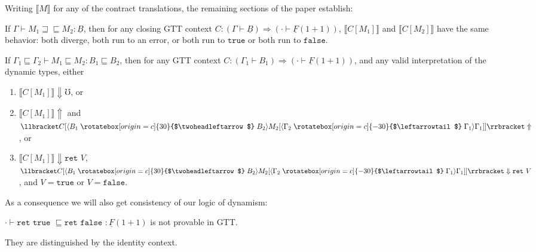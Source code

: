 \documentclass[acmsmall,screen,12pt]{acmart}
\newif\iflong
\renewcommand{\u}{\underline}
\newcommand{\sem}[1]{\llbracket#1\rrbracket}
\newcommand{\ltdyn}{\sqsubseteq}
\newcommand{\gtdyn}{\sqsupseteq}
\newcommand{\equidyn}{\mathrel{\gtdyn\ltdyn}}
\newcommand{\tru}{\texttt{true}}
\newcommand{\fls}{\texttt{false}}
\newcommand{\uarrow}{\mathrel{\rotatebox[origin=c]{-30}{$\leftarrowtail$}}}
\newcommand{\darrow}{\mathrel{\rotatebox[origin=c]{30}{$\twoheadleftarrow$}}}
\newcommand{\upcast}[2]{\langle{#2}\uarrow{#1}\rangle}
\newcommand{\dncast}[2]{\langle{#1}\darrow{#2}\rangle}
\newcommand{\err}{\mho}
\newcommand{\kw}[1]{\texttt{#1}\,\,}
\newcommand{\ret}{\kw{ret}}
\begin{document}
Writing $\sem{M}$ for any of the contract translations, the remaining
sections of the paper establish:
\begin{theorem}
  If $\Gamma \vdash M_1 \equidyn M_2 : \u B$, then for any closing
  GTT context $C : (\Gamma \vdash \u B) \Rightarrow (\cdot \vdash \u F
  (1+1))$, $\sem{C[M_1]}$ and $\sem{C[M_2]}$ have the same behavior: both diverge,
  both run to an error, or both run to $\tru$ or both run to $\fls$.
\end{theorem}
\begin{theorem}[Graduality]
  If $\Gamma_1 \ltdyn \Gamma_2 \vdash M_1 \ltdyn M_2 : B_1 \ltdyn B_2$,
  then for any GTT context $C : (\Gamma_1 \vdash B_1) \Rightarrow (\cdot
  \vdash \u F (1+1))$, and any valid interpretation of the dynamic
  types, either
  \begin{enumerate}
  \item $\sem{C[M_1]} \Downarrow \err$, or
  \item $\sem{C[M_1]} \Uparrow$ and $\sem{C[\dncast{B_1}{B_2}M_2[\upcast{\Gamma_1}{\Gamma_2}{\Gamma_1}]]} \Uparrow$, or
  \item $\sem{C[M_1]} \Downarrow \ret V$,~~
    $\sem{C[\dncast{B_1}{B_2}M_2[\upcast{\Gamma_1}{\Gamma_2}{\Gamma_1}]]} 
    \Downarrow \ret V$, and $V = \tru$ or $V = \fls$.
  \end{enumerate}
\end{theorem}

As a consequence we will also get consistency of our logic of
dynamism:
\begin{corollary}[Consistency \iflong of GTT \fi]
  $\cdot \vdash \ret \kw{true} \ltdyn \ret \kw{false} : \u F(1+1)$ is not
  provable in GTT.
\end{corollary}
\begin{longproof}
  They are distinguished by the identity context.
\end{longproof}
\end{document}
